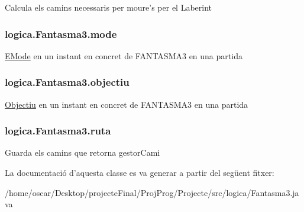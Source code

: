Calcula els camins necessaris per moure's per el Laberint \hypertarget{classlogica_1_1_fantasma3_a42c7e17e87979122ed5c19aa4b2286f8}{
\subsubsection[{mode}]{ logica.\+Fantasma3.\+mode\hspace{0.3cm}{\ttfamily [private]}}}\label{classlogica_1_1_fantasma3_a42c7e17e87979122ed5c19aa4b2286f8}
\hyperlink{enumlogica_1_1_fantasma3_1_1_e_mode}{E\+Mode} en un instant en concret de F\+A\+N\+T\+A\+S\+M\+A3 en una partida \hypertarget{classlogica_1_1_fantasma3_a13e89583eb5f6a4fb3f41595833a9b79}{
\subsubsection[{objectiu}]{ logica.\+Fantasma3.\+objectiu\hspace{0.3cm}{\ttfamily [private]}}}\label{classlogica_1_1_fantasma3_a13e89583eb5f6a4fb3f41595833a9b79}
\hyperlink{classlogica_1_1_fantasma3_1_1_objectiu}{Objectiu} en un instant en concret de F\+A\+N\+T\+A\+S\+M\+A3 en una partida \hypertarget{classlogica_1_1_fantasma3_a270da1ca223914034c125b12479973b1}{
\subsubsection[{ruta}]{ logica.\+Fantasma3.\+ruta\hspace{0.3cm}{\ttfamily [private]}}}\label{classlogica_1_1_fantasma3_a270da1ca223914034c125b12479973b1}
Guarda els camins que retorna gestor\+Cami 

La documentació d'aquesta classe es va generar a partir del següent fitxer\+:\begin{DoxyCompactItemize}
\item 
/home/oscar/\+Desktop/projecte\+Final/\+Proj\+Prog/\+Projecte/src/logica/Fantasma3.\+java\end{DoxyCompactItemize}
